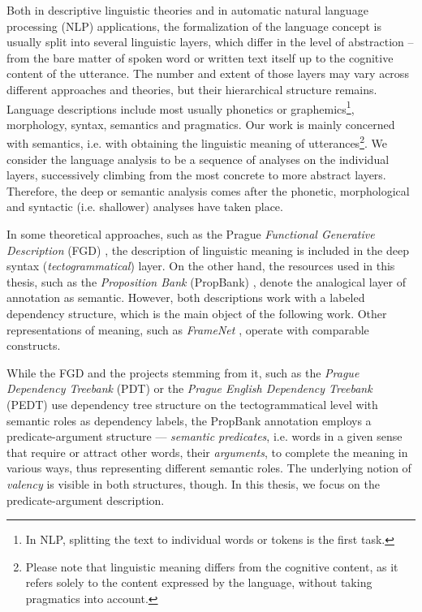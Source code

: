 \documentclass[12pt,notitlepage]{report}
\begin{document}
Both in descriptive linguistic theories and in automatic natural language processing (NLP) applications, the formalization of the language concept is usually split into several linguistic layers, which differ in the level of abstraction -- from the bare matter of spoken word or written text itself up to the cognitive content of the utterance. The number and extent of those layers may vary across different approaches and theories, but their hierarchical structure remains. Language descriptions include most usually phonetics or graphemics\footnote{In NLP, splitting the text to individual words or tokens is the first task.}, morphology, syntax, semantics and pragmatics. Our work is mainly concerned with semantics, i.e. with obtaining the linguistic meaning \citep[p. 35ff.]{sgall86} of utterances\footnote{Please note that linguistic meaning differs from the cognitive content, as it refers solely to the content expressed by the language, without taking pragmatics into account.}. We consider the language analysis to be a sequence of analyses on the individual layers, successively climbing from the most concrete to more abstract layers. Therefore, the deep or semantic analysis comes after the phonetic, morphological and syntactic (i.e. shallower) analyses have taken place.

In some theoretical approaches, such as the Prague \emph{Functional Generative Description} (FGD) \citep{sgall86}, the description of linguistic meaning is included in the deep syntax (\emph{tectogrammatical}) layer. On the other hand, the resources used in this thesis, such as the \emph{Proposition Bank} (PropBank) \linebreak[4] \citep{palmer05}, denote the analogical layer of annotation as semantic. However, both descriptions work with a labeled dependency structure, which is the main object of the following work. Other representations of meaning, such as \emph{Frame\-Net} \citep{baker98}, operate with comparable constructs.

While the FGD and the projects stemming from it, such as the \emph{Prague Dependency Treebank} (PDT) \citep{hajic06} or the \emph{Prague English Dependency Treebank} (PEDT) \citep{cinkova09} use dependency tree structure on the tectogrammatical level with semantic roles as dependency labels, the PropBank annotation \citep{kingsbury03} employs a predicate-argument structure --- \emph{semantic predicates}, i.e. words in a given sense that require or attract other words, their \emph{arguments}, to complete the meaning in various ways, thus representing different semantic roles. The underlying notion of \emph{valency} is visible in both structures, though. In this thesis, we focus on the predicate-argument description.
\end{document}
